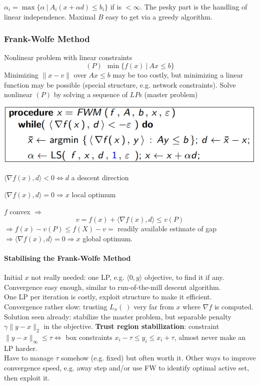 \documentclass[10pt]{report}
\begin{document}
$\alpha_i = \max\{\alpha\:|\:A_i(x+\alpha d)\leq b_i\}$ if is $< \infty$. The pesky part is the handling of linear independence. Maximal $B$ easy to get via a greedy algorithm.
\pagebreak
\subsubsection{Frank-Wolfe Method}
Nonlinear problem with linear constraints $$(P)\:\:\min\{f(x)\:|\:Ax\leq b\}$$
Minimizing $\|x-v\|$ over $Ax\leq b$ may be too costly, but minimizing a linear function may be possible (special structure, e.g. network constraints). Solve nonlinear $(P)$ by solving a sequence of $LP$s (master problem)
\begin{center}
	\includegraphics[scale=0.75]{13.png}
\end{center}
\begin{list}{}{}
	\item $\langle \nabla f(x),d\rangle<0 \Leftrightarrow d$ a descent direction
	\item $\langle \nabla f(x),d\rangle = 0 \Rightarrow x$ local optimum
\end{list}
$f$ convex $\Rightarrow$ $$v = f(x) + \langle \nabla f(x),d\rangle\leq v(P)$$ $\Rightarrow f(x) - v(P)\leq f(X) - v =$ readily available estimate of gap $\Rightarrow \langle \nabla f(x),d\rangle = 0 \Rightarrow x$ global optimum.
\paragraph{Stabilising the Frank-Wolfe Method} Initial $x$ not really needed: one LP, e.g. $\langle 0,y\rangle$ objective, to find it if any.\\
Convergence easy enough, similar to run-of-the-mill descent algorithm.\\
One LP per iteration is costly, exploit structure to make it efficient.\\
Convergence rather slow: trusting $L_x(\:)$ very far from $x$ where $\nabla f$ is computed.\\
Solution seen already: stabilize the master problem, but separable penalty $\gamma\|y-x\|_2$ in the objective. \textbf{Trust region stabilization}: constraint $\|y-x\|_\infty \leq \tau\Leftrightarrow$ box constraints $x_i-\tau\leq y_i\leq x_i+\tau$, almost never make an LP harder.\\
Have to manage $\tau$ somehow (e.g. fixed) but often worth it. Other ways to improve convergence speed, e.g. away step and/or use FW to identify optimal active set, then exploit it.
\end{document}
